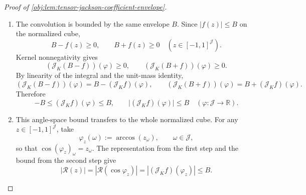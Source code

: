 \begin{proof}[Proof of \cref{obj:lem:tensor-jackson-coefficient-envelope}]
\begin{enumerate}
\[\int_{\mathbb T_{\mathcal J}}
W_{\omega_0,\eta}(\psi)
\{\chi^{\cos}_{K,r}\sin(r\psi_{\omega_0})+\chi^{\sin}_{K,r}\cos(r\psi_{\omega_0})\}\,d\psi .
\]
Substituting the finite expansion of \(J_K(t-\psi_{\omega_0})\), using the angle-subtraction identities for sine and cosine, and integrating the finite sum term by term gives
\[
(\mathcal J_K f)(\eta_{\omega_0}\leftarrow t)
=
\sum_{r=0}^{N_K}
\{\Xi^{\cos}_{\omega_0,\eta,r}\cos(rt)+\Xi^{\sin}_{\omega_0,\eta,r}\sin(rt)\}.
\]
Thus each one-coordinate section is a trigonometric polynomial of frequency at most \(N_K\).  The same section is even in that coordinate: reflecting the integration variable \(\tau_{\omega_0}\mapsto-\tau_{\omega_0}\) preserves \(\mathbb T_{\mathcal J}\), the kernel is even, and cosine is even.  Therefore the sine part cancels.  Interpolating the resulting even trigonometric polynomial in one cosine coordinate at the nodes
\[
\xi_j=\frac{j}{N_K+1},\qquad
\zeta_j=\arccos(\xi_j),\qquad j=0,\ldots,N_K,
\]
and repeating this coordinate by coordinate gives a polynomial \(\mathcal R\) in the four variables such that
\[
\mathcal R(\cos\varphi)=(\mathcal J_K f)(\varphi)
\quad\text{for every }\varphi:\mathcal J\to\mathbb R.
\]
The interpolation basis has degree at most \(N_K\) in the coordinate being added, while the induction hypothesis controls the other coordinates.  Hence, for every
\(\beta\in\operatorname{supp}(\mathcal R)\),
\[
\beta_\omega\le N_K=2(K-1)
\quad\text{for every }\omega\in\mathcal J,
\]
and
\[
\deg(\mathcal R)\le 4N_K=8(K-1).
\]

\item
The convolution is bounded by the same envelope \(B\).  Since
\(\lvert f(z)\rvert\le B\) on the normalized cube,
\[
B-f(z)\ge0,
\qquad
B+f(z)\ge0
\quad
(z\in[-1,1]^{\mathcal J}).
\]
Kernel nonnegativity gives
\[
(\mathcal J_K(B-f))(\varphi)\ge0,
\qquad
(\mathcal J_K(B+f))(\varphi)\ge0 .
\]
By linearity of the integral and the unit-mass identity,
\[
(\mathcal J_K(B-f))(\varphi)
=
B-(\mathcal J_K f)(\varphi),
\qquad
(\mathcal J_K(B+f))(\varphi)
=
B+(\mathcal J_K f)(\varphi).
\]
Therefore
\[
-B\le(\mathcal J_K f)(\varphi)\le B,
\qquad
\lvert(\mathcal J_K f)(\varphi)\rvert\le B
\quad
(\varphi:\mathcal J\to\mathbb R).
\]

\item
This angle-space bound transfers to the whole normalized cube.  For any
\(z\in[-1,1]^{\mathcal J}\), take
\[
\varphi_z(\omega):=\arccos(z_\omega),
\qquad \omega\in\mathcal J,
\]
so that \(\cos(\varphi_z)_\omega=z_\omega\).  The representation from the first step and the bound from the second step give
\[
|\mathcal R(z)|
=
|\mathcal R(\cos\varphi_z)|
=
|(\mathcal J_K f)(\varphi_z)|
\le B .
\]


\end{enumerate}
\end{proof}
